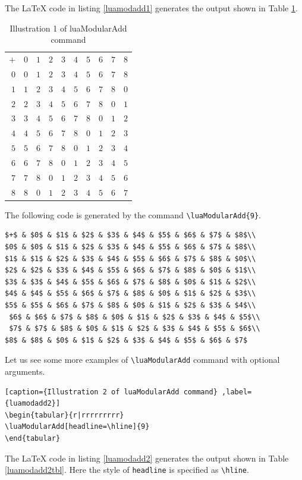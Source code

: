 ﻿\documentclass{article}
\begin{document}
The LaTeX code in listing \ref{luamodadd1} generates the output shown in Table  \ref{luamodadd1tbl}.
\begin{table}[H]
\centering
\begin{tabular}{r|rrrrrrrrr}
$+$ & $0$ & $1$ & $2$ & $3$ & $4$ & $5$ & $6$ & $7$ & $8$\\ $0$ & $0$ & $1$ & $2$ & $3$ & $4$ & $5$ & $6$ & $7$ & $8$\\ $1$ & $1$ & $2$ & $3$ & $4$ & $5$ & $6$ & $7$ & $8$ & $0$\\ $2$ & $2$ & $3$ & $4$ & $5$ & $6$ & $7$ & $8$ & $0$ & $1$\\ $3$ & $3$ & $4$ & $5$ & $6$ & $7$ & $8$ & $0$ & $1$ & $2$\\ $4$ & $4$ & $5$ & $6$ & $7$ & $8$ & $0$ & $1$ & $2$ & $3$\\ $5$ & $5$ & $6$ & $7$ & $8$ & $0$ & $1$ & $2$ & $3$ & $4$\\ $6$ & $6$ & $7$ & $8$ & $0$ & $1$ & $2$ & $3$ & $4$ & $5$\\ $7$ & $7$ & $8$ & $0$ & $1$ & $2$ & $3$ & $4$ & $5$ & $6$\\ $8$ & $8$ & $0$ & $1$ & $2$ & $3$ & $4$ & $5$ & $6$ & $7$
\end{tabular}
\caption{Illustration 1 of luaModularAdd command}
\label{luamodadd1tbl}
\end{table}


The following code is generated by the command \verb|\luaModularAdd{9}|.
\begin{lstlisting}
$+$ & $0$ & $1$ & $2$ & $3$ & $4$ & $5$ & $6$ & $7$ & $8$\\
$0$ & $0$ & $1$ & $2$ & $3$ & $4$ & $5$ & $6$ & $7$ & $8$\\
$1$ & $1$ & $2$ & $3$ & $4$ & $5$ & $6$ & $7$ & $8$ & $0$\\
$2$ & $2$ & $3$ & $4$ & $5$ & $6$ & $7$ & $8$ & $0$ & $1$\\
$3$ & $3$ & $4$ & $5$ & $6$ & $7$ & $8$ & $0$ & $1$ & $2$\\
$4$ & $4$ & $5$ & $6$ & $7$ & $8$ & $0$ & $1$ & $2$ & $3$\\
$5$ & $5$ & $6$ & $7$ & $8$ & $0$ & $1$ & $2$ & $3$ & $4$\\
 $6$ & $6$ & $7$ & $8$ & $0$ & $1$ & $2$ & $3$ & $4$ & $5$\\
 $7$ & $7$ & $8$ & $0$ & $1$ & $2$ & $3$ & $4$ & $5$ & $6$\\
$8$ & $8$ & $0$ & $1$ & $2$ & $3$ & $4$ & $5$ & $6$ & $7$
\end{lstlisting}
Let us see some more examples of \verb|\luaModularAdd| command with optional arguments.
\begin{lstlisting}[caption={Illustration 2 of luaModularAdd command} ,label={luamodadd2}]
\begin{tabular}{r|rrrrrrrrr}
\luaModularAdd[headline=\hline]{9}
\end{tabular}
\end{lstlisting}
The LaTeX code in listing \ref{luamodadd2} generates the output shown in Table  \ref{luamodadd2tbl}. Here the style of \verb|headline| is specified as \verb|\hline|.
\end{document}
